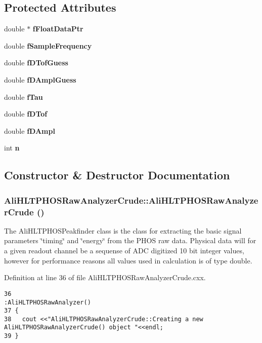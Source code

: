 \subsection*{Protected Attributes}
\begin{CompactItemize}
\item 
double $\ast$ {\bf f\-Float\-Data\-Ptr}
\item 
double {\bf f\-Sample\-Frequency}
\item 
double {\bf f\-DTof\-Guess}
\item 
double {\bf f\-DAmpl\-Guess}
\item 
double {\bf f\-Tau}
\item 
double {\bf f\-DTof}
\item 
double {\bf f\-DAmpl}
\item 
int {\bf n}
\end{CompactItemize}


\subsection{Constructor \& Destructor Documentation}
\subsubsection{\setlength{\rightskip}{0pt plus 5cm}Ali\-HLTPHOSRaw\-Analyzer\-Crude::Ali\-HLTPHOSRaw\-Analyzer\-Crude ()}\label{classAliHLTPHOSRawAnalyzerCrude_AliHLTPHOSRawAnalyzerCrudea0}


The Ali\-HLTPHOSPeakfinder class is the class for extracting the basic signal parameters \char`\"{}timing\char`\"{} and \char`\"{}energy\char`\"{} from the PHOS raw data. Physical data will for a given readout channel be a sequense of ADC digitized 10 bit integer values, however for performance reasons all values used in calculation is of type double. 

Definition at line 36 of file Ali\-HLTPHOSRaw\-Analyzer\-Crude.cxx.

\footnotesize\begin{verbatim}36                                                       :AliHLTPHOSRawAnalyzer() 
37 {
38   cout <<"AliHLTPHOSRawAnalyzerCrude::Creating a new AliHLTPHOSRawAnalyzerCrude() object "<<endl;
39 }
\end{verbatim}\normalsize 


